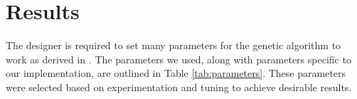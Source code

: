 \documentclass[letterpaper, 10 pt, conference]{ieeeconf}  %
\begin{document}
%

\section{Results}\label{results}
The designer is required to set many parameters for the genetic algorithm to work as derived in \cite{Parkinson2019}. The parameters we used, along with parameters specific to our implementation, are outlined in Table \ref{tab:parameters}. These parameters were selected based on experimentation and tuning to achieve desirable results.
\end{document}
